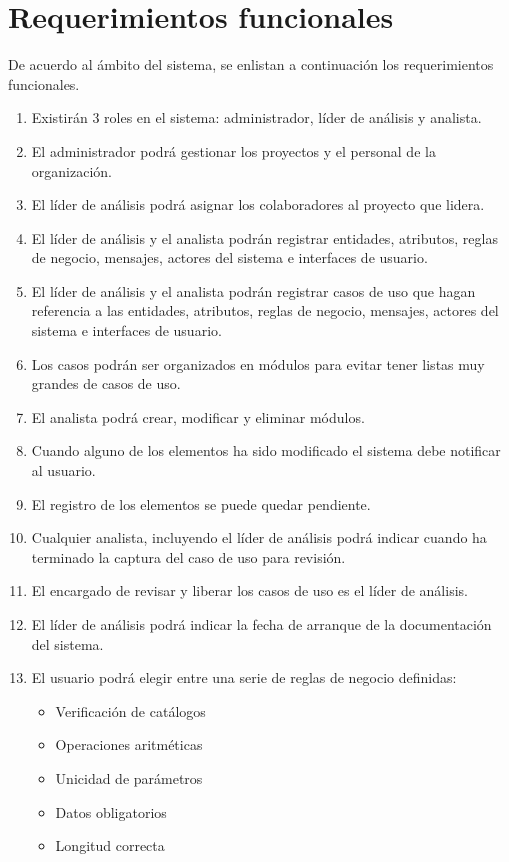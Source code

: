 \section{Requerimientos funcionales}
De acuerdo al ámbito del sistema, se enlistan a continuación los requerimientos funcionales.
\begin{enumerate}[{\bf RF01.}]
 \item Existirán 3 roles en el sistema: administrador, líder de análisis y analista.
 \item El administrador podrá gestionar los proyectos y el personal de la organización.
 \item El líder de análisis podrá asignar los colaboradores al proyecto que lidera.
 \item El líder de análisis y el analista podrán registrar entidades, atributos, reglas de negocio, mensajes, actores del sistema e interfaces de usuario.
 \item El líder de análisis y el analista podrán registrar casos de uso que hagan referencia a las entidades, atributos, reglas de negocio, mensajes, actores del sistema e interfaces de usuario.
 \item Los casos podrán ser organizados en módulos para evitar tener listas muy grandes de casos de uso.
 \item El analista podrá crear, modificar y eliminar módulos.
 \item Cuando alguno de los elementos ha sido modificado el sistema debe notificar al usuario.
 \item El registro de los elementos se puede quedar pendiente.
 \item Cualquier analista, incluyendo el líder de análisis podrá indicar cuando ha terminado la captura del caso de uso para revisión.
 \item El encargado de revisar y liberar los casos de uso es el líder de análisis.
 \item El líder de análisis podrá indicar la fecha de arranque de la documentación del sistema.
 \item El usuario podrá elegir entre una serie de reglas de negocio definidas:
	\begin{itemize}
		\item Verificación de catálogos
		\item Operaciones aritméticas
		\item Unicidad de parámetros
		\item Datos obligatorios
		\item Longitud correcta

\end{itemize}
\end{enumerate}

